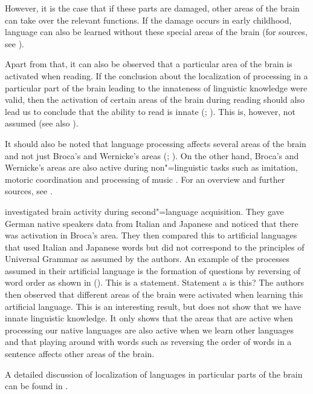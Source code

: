 However, it is the case that if these parts are damaged, other areas of the brain can take over the relevant
functions. If the damage occurs in early childhood, language can also be learned without these special areas
of the brain (for sources, see \citealp[Section~4.1]{Dabrowska2004a}).

Apart from that, it can also be observed that a particular area of the brain is activated when reading. If the conclusion about the localization of processing 
in a particular part of the brain leading to the innateness of linguistic knowledge were valid, then the activation of certain
areas of the brain during reading should also lead us to conclude that the ability to read is innate
(\citealp[]{EBJKSPP96a};
\citealp[]{Bishop2002a}). This is, however, not assumed (see also \citealp*[]{FHC2005a}). 

It should also be noted that language processing affects several areas of the brain and not just Broca's and Wernicke's areas (\citealp[]{FM2005a}; \citealp{Friederici2009a}). On the other hand, Broca's and Wernicke's areas are also active during non"=linguistic tasks
such as imitation, motoric coordination and processing of music \citep{MKGF2001a}. For an overview and further sources,
see .

\citet{MMGRRBW2003a} investigated brain activity during second"=language acquisition. They gave German native speakers data from Italian and Japanese and noticed
that there was activation in Broca's area. They then compared this to artificial languages that used Italian and Japanese words but did
not correspond to the principles of Universal Grammar as assumed by the authors. An example of the processes assumed in their artificial language is the formation
of questions by reversing of word order as shown in ().
\eal
\ex This is a statement.
\ex Statement a is this?
\zl
The authors then observed that different areas of the brain were activated when learning this artificial language. This is an interesting result, but does not show
that we have innate linguistic knowledge. It only shows that the areas that are active when processing our native languages are also active when we learn other
languages and that playing around with words such as reversing the order of words in a sentence affects other areas of the brain.

A detailed discussion of localization of languages in particular parts of the brain can be found
in .


